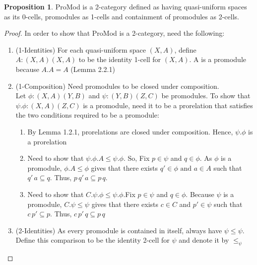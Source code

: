 \documentclass[18pt,a4paper]{article}
\makeatletter
\theoremstyle{definition}
\newtheorem{proop}[theorem]{Proposition}
\newcommand{\carrow}{}%
\DeclareRobustCommand{\carrow}{%
	\mathrel{\vphantom{\rightarrow}\mathpalette\circle@arrow\relax}%
}
\newcommand{\circle@arrow}[2]{%
	\m@th
	\ooalign{%
		\hidewidth$#1\circ\mkern1mu$\hidewidth\cr
	$#1\longrightarrow$\cr}%
}
\makeatother
\begin{document}
		\begin{proop}%
			ProMod is a 2-category defined as having quasi-uniform spaces as its 0-cells,
			promodules as 1-cells and containment of promodules as 2-cells.
		\end{proop}
		\begin{proof}\setcounter{equation}{0}
			In order to show that ProMod is a 2-category, need the following:
			\begin{enumerate}[label=(\alph*)]
				\item (1-Identities) For each quasi-uniform space $(X,A)$,
					define $A:(X,A) \carrow (X,A)$ to be the identity 1-cell for $(X,A)$. A is a promodule
					because $A.A=A$ (Lemma 2.2.1)
				\item (1-Composition) Need promodules to be closed under composition.\\
					Let $\phi:(X,A)\carrow (Y,B)$ and $\psi:(Y,B)\carrow (Z,C)$ be promodules.
					To show that $\psi.\phi:(X,A) \carrow (Z,C)$ is a promodule, need it to be a
					prorelation that satisfies the two conditions required to be a promodule:
					\begin{enumerate}[label=(\roman*)]
						\item By Lemma 1.2.1, prorelations are closed under composition.
							Hence, $\psi.\phi$ is a prorelation
						\item Need to show that $\psi.\phi.A \leq \psi.\phi$. So, Fix
							$p \in \psi$ and $q \in \phi$. As $\phi$ is a promodule,
							$\phi.A\leq \phi$ gives that there exists
							$ q' \in \phi \text{ and } a\in A$ such that
							$q'\,a \subseteq q$. Thus,
							$p\,q'\,a \subseteq p\,q$.
						\item Need to show that $C.\psi.\phi \leq \psi.\phi$.Fix $p \in \psi$
							and $q\in \phi$. Because
							$\psi$ is a promodule, $C.\psi \leq \psi$ gives that
							there exists $c\in C$ and $p' \in \psi$ such that
							$c\,p' \subseteq p$. Thus, $c\,p'\,q \subseteq p\,q$
					\end{enumerate}
				\item (2-Identities) As every promodule is contained in itself, always have $\psi \leq \psi$.
					Define this comparison to be the identity 2-cell for $\psi$ and denote it by $\leq_\psi$


\end{enumerate}
\end{proof}
\end{document}
